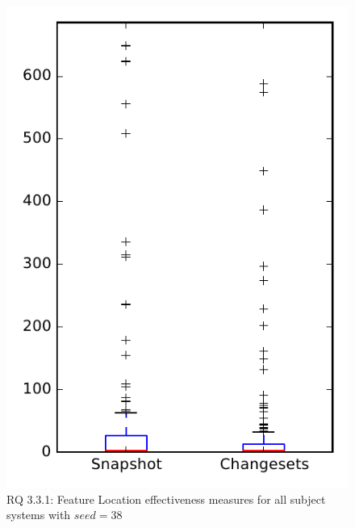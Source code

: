
\begin{figure}
\centering
\includegraphics[height=0.4\textheight]{figures/flt_seed/rq1_overview_38}
\caption{RQ 3.3.1: Feature Location effectiveness measures for all subject systems with $seed=38$}
\label{fig:flt_seed:rq1:overview}
\end{figure}
